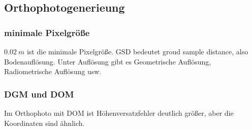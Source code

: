 \documentclass[12pt]{article}
\begin{document}
\subsection{Orthophotogenerieung}
\subsubsection{minimale Pixelgröße}
$0.02 \ m$ ist die minimale Pixelgröße. GSD bedeutet groud sample distance, also Bodenauflösung. Unter Auflösung gibt es Geometrische Auflösung, Radiometrische Auflösung usw.
\subsubsection{DGM und DOM}
\begin{figure}[ht]\centering
\end{figure}
\noindent Im Orthophoto mit DOM ist Höhenversatzfehler deutlich größer, aber die Koordinaten sind ähnlich. \newpage
\end{document}
